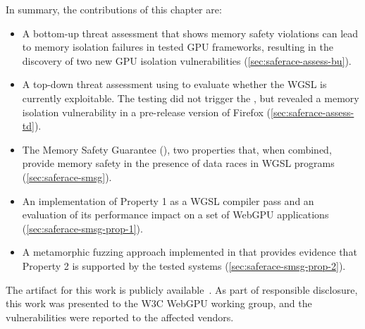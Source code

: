 In summary, the contributions of this chapter are:

\begin{itemize}
    \item A bottom-up threat assessment that shows memory safety violations can lead to memory isolation failures in tested GPU frameworks, resulting in the discovery of two new GPU isolation vulnerabilities (\mysec\ref{sec:saferace-assess-bu}).
    \item A top-down threat assessment using \wgslmemsmith to evaluate whether the WGSL \drsv is currently exploitable. The testing did not trigger the \drsv, but revealed a memory isolation vulnerability in a pre-release version of Firefox (\mysec\ref{sec:saferace-assess-td}).
    \item The \saferace Memory Safety Guarantee (\smsg), two properties that, when combined, provide memory safety in the presence of data races in WGSL programs (\mysec\ref{sec:saferace-smsg}).
    \item An implementation of \smsg Property 1 as a WGSL compiler pass and an evaluation of its performance impact on a set of WebGPU applications (\mysec\ref{sec:saferace-smsg-prop-1}).
    \item A metamorphic fuzzing approach implemented in \wgslmemsmith that provides evidence that \smsg Property 2 is supported by the tested systems (\mysec\ref{sec:saferace-smsg-prop-2}).
\end{itemize}

\noindent
The artifact for this work is publicly available~\cite{levine2025saferaceartifact}. As part of responsible disclosure, this work was presented to the W3C WebGPU working group, and the vulnerabilities were reported to the affected vendors.

